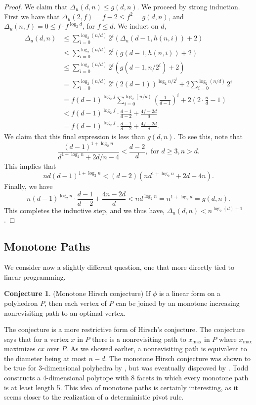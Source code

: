 \documentclass[11pt,a4paper]{article}
\theoremstyle{definition}
\newtheorem{conj}[thm]{Conjecture}
\begin{document}
\begin{proof}
We claim that $\Delta_u(d,n)\le g(d,n)$. We proceed by strong induction. First we have that $\Delta_u(2,f)=f-2\le f^2=g(d,n)$, and $\Delta_u(n,f)=0\le f\cdot f^{\log_2 d}$, for $f\le d$. We induct on $d$,
\begin{align*}
\Delta_u(d,n)&\le\sum_{i=0}^{\log_2(n/d)} 2^i\left(\Delta_u(d-1,h(n,i))+2\right)\\
&\le\sum_{i=0}^{\log_2(n/d)} 2^i \left(g(d-1,h(n,i))+2\right)\\
&\le\sum_{i=0}^{\log_2(n/d)} 2^i \left(g(d-1,n/2^i)+2\right)\\
&=\sum_{i=0}^{\log_2(n/d)} 2^i (2(d-1))^{\log_2 n/2^i}+2\sum_{i=0}^{\log_2(n/d)}2^i \\
&=f(d-1)^{\log_2 f}\sum_{i=0}^{\log_2(n/d)} \left(\frac{1}{d-1}\right)^i+2(2\cdot\frac{n}{d}-1)\\
&<f(d-1)^{\log_2 f}\cdot\frac{d-1}{d-2}+\frac{4f-2d}{d}\\
&=f(d-1)^{\log_2 f}\cdot\frac{d-1}{d-2}+\frac{4f-2d}{d}.
\end{align*}
We claim that this final expression is less than $g(d,n)$. To see this, note that
$$\frac{(d-1)^{1+\log_2 n}}{d^{1+\log_2 n}+2d/n-4}<\frac{d-2}{d}, \text{ for }d\ge 3,n>d.$$
This implies that
$$nd(d-1)^{1+\log_2 n}<(d-2)\left(nd^{1+\log_2 n}+2d-4n\right).$$
Finally, we have
$$n(d-1)^{\log_2 n}\cdot\frac{d-1}{d-2}+\frac{4n-2d}{d}<nd^{\log_2 n}=n^{1+\log_2 d}=g(d,n).$$
This completes the inductive step, and we thus have, $\Delta_u(d,n)<n^{\log_2(d)+1}$.
\end{proof}
\subsection{Monotone Paths}
We consider now a slightly different question, one that more directly tied to linear programming.
\begin{conj}
(Monotone Hirsch conjecture) If $\phi$ is a linear form on a polyhedron $P$, then each vertex of $P$ can be joined by an monotone increasing nonrevisiting path to an optimal vertex.
\end{conj}
The conjecture is a more restrictive form of Hirsch's conjecture. The conjecture says that for a vertex $x$ in $P$ there is a nonrevisiting path to $x_{\max}$ in $P$ where $x_{\max}$ maximizes $cx$ over $P$. As we showed earlier, a nonrevisiting path is equivalent to the diameter being at most $n-d$. The monotone Hirsch conjecture was shown to be true for 3-dimensional polyhedra by \citet{klee65}, but was eventually disproved by \citet{todd80}. Todd constructs a 4-dimensional polytope with 8 facets in which every monotone path is at least length 5. This idea of monotone paths is certainly interesting, as it seems closer to the realization of a deterministic pivot rule.
\end{document}
